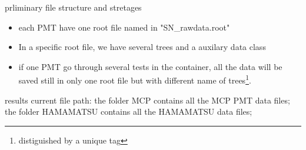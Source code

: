 \begin{frame}{prliminary file structure and stretages}
\begin{itemize}
\item each PMT have one root file named in "SN\_rawdata.root"
\item In a specific root file, we have several trees and a auxilary data class
\item if one PMT go through several tests in the container, all the data will be saved still in only one root file but with different name of trees\footnote{distiguished by a unique tag}. 
\end{itemize}

\end{frame}
\begin{frame}{results}
current file path:
the folder MCP contains all the MCP PMT data files;
the folder HAMAMATSU contains all the  HAMAMATSU data files;
 
\end{frame}
%
%
